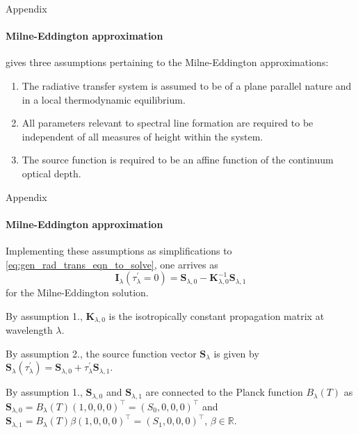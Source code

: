 \documentclass{beamer}
\newcommand\matr[1]{\ensuremath{\boldsymbol{\mathbf{#1}}}}
\newcommand\vect[1]{\ensuremath{\bm{#1}}}
\begin{document}
\begin{frame}[allowframebreaks]{Appendix}
	\framesubtitle{Milne-Eddington approximation}
	
	\cite[p.411]{DeglInnocenti.2005} gives three assumptions pertaining to the Milne-Eddington approximations:
	\begin{enumerate}
		\item The radiative transfer system is assumed to be of a plane parallel nature and in a local thermodynamic equilibrium.
		\item All parameters relevant to spectral line formation are required to be independent of all measures of height within the system.
		\item The source function is required to be an affine function of the continuum optical depth.
	\end{enumerate}
	
\end{frame}
\begin{frame}[allowframebreaks]{Appendix}
	\framesubtitle{Milne-Eddington approximation}
	
	Implementing these assumptions as simplifications to \cref{eq:gen_rad_trans_eqn_to_solve}, one arrives as \begin{equation}
		\vect{I}_\lambda(\tau_\lambda^\prime=0) = \vect{S}_{\lambda,0} - \matr{K}_{\lambda,0}^{-1}\vect{S}_{\lambda,1}
	\end{equation} for the Milne-Eddington solution.
	
	By assumption 1., $\matr{K}_{\lambda,0}$ is the isotropically constant propagation matrix at wavelength $\lambda$.
	
	By assumption 2., the source function vector $\vect{S}_\lambda$ is given by $\vect{S}_\lambda(\tau_\lambda^\prime) = \vect{S}_{\lambda,0} + \tau_\lambda^\prime \vect{S}_{\lambda,1}$.
	
	By assumption 1., $\vect{S}_{\lambda,0}$ and $\vect{S}_{\lambda,1}$ are connected to the Planck function $B_\lambda(T)$ as $\vect{S}_{\lambda,0} = B_\lambda(T)(1,0,0,0)^\top = (S_0,0,0,0)^\top$ and $\vect{S}_{\lambda,1} = B_\lambda(T)\beta(1,0,0,0)^\top = (S_1,0,0,0)^\top$, $\beta \in \mathbb{R}$.
\end{frame}
\end{document}
